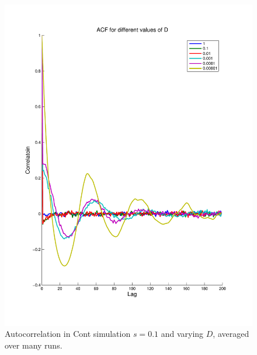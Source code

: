 \documentclass[runningheads]{llncs}
\begin{document}
\begin{figure}[htbp]
  \begin{center}   \includegraphics[width=1.00\textwidth]{../graphics/comparisonOfACFs.pdf}
    \caption{Autocorrelation in Cont simulation $s=0.1$ and varying $D$, averaged over many runs.}
    \label{fig:ContACF2}
  \end{center}
\end{figure}
\end{document}
